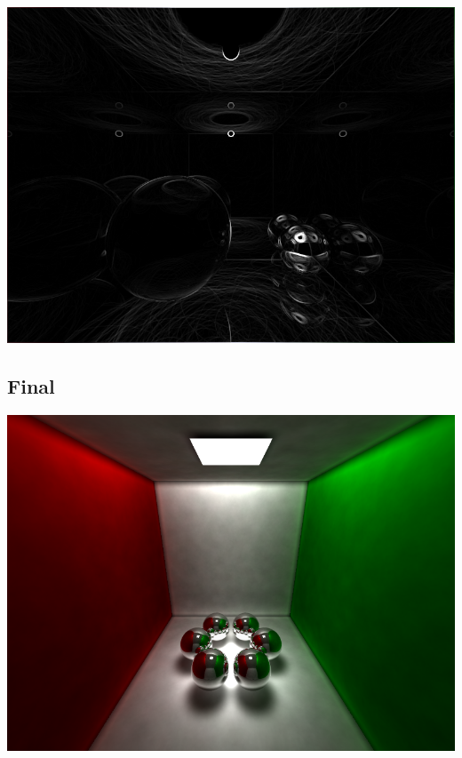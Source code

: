 \documentclass[a4paper]{article}
\begin{document}
\begin{center}
	\includegraphics[scale=0.45]{images/gallery/sobel.png}
	\label{fig:sobel}
\end{center}

\cleardoublepage
\subsection{Final}

\begin{center}
	\includegraphics[scale=0.43]{images/gallery/balls.png}
	\label{fig:balls}
\end{center}
\end{document}
